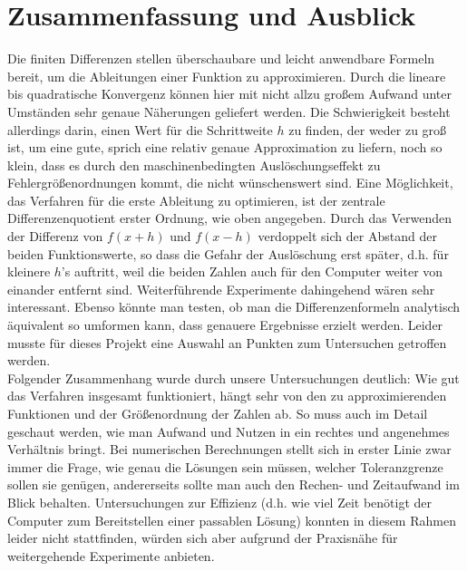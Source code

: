 \documentclass{scrartcl}
\begin{document}
\pagebreak \section{Zusammenfassung und Ausblick}
\label{sec:zusammenfassung}
Die finiten Differenzen stellen überschaubare und leicht anwendbare Formeln bereit, um die Ableitungen einer Funktion zu approximieren.
Durch die lineare bis quadratische Konvergenz können hier mit nicht allzu großem Aufwand unter Umständen sehr genaue Näherungen geliefert werden.
Die Schwierigkeit besteht allerdings darin, einen Wert für die Schrittweite $h$ zu finden, der weder zu groß ist, um eine gute, sprich eine relativ genaue Approximation zu liefern, noch so klein, dass es durch den maschinenbedingten Auslöschungseffekt zu Fehlergrößenordnungen kommt, die nicht wünschenswert sind.
Eine Möglichkeit, das Verfahren für die erste Ableitung zu optimieren, ist der zentrale Differenzenquotient erster Ordnung, wie oben angegeben. Durch das Verwenden der Differenz von $f(x+h)$ und $f(x-h)$ verdoppelt sich der Abstand der beiden Funktionswerte, so dass die Gefahr der Auslöschung erst später, d.h. für kleinere $h$'s auftritt, weil die beiden Zahlen auch für den Computer weiter von einander entfernt sind.
Weiterführende Experimente dahingehend wären sehr interessant.
Ebenso könnte man testen, ob man die Differenzenformeln analytisch äquivalent so umformen kann, dass genauere Ergebnisse erzielt werden. Leider musste für dieses Projekt eine Auswahl an Punkten zum Untersuchen getroffen werden. \\
Folgender Zusammenhang wurde durch unsere Untersuchungen deutlich:
Wie gut das Verfahren insgesamt funktioniert, hängt sehr von den zu approximierenden Funktionen und der Größenordnung der Zahlen ab.
So muss auch im Detail geschaut werden, wie man Aufwand und Nutzen in ein rechtes und angenehmes Verhältnis bringt.
Bei numerischen Berechnungen stellt sich in erster Linie zwar immer die Frage, wie genau die Lösungen sein müssen, welcher Toleranzgrenze sollen sie genügen, andererseits sollte man auch den Rechen- und Zeitaufwand im Blick behalten.
Untersuchungen zur Effizienz (d.h. wie viel Zeit benötigt der Computer zum Bereitstellen einer passablen Lösung) konnten in diesem Rahmen leider nicht stattfinden, würden sich aber aufgrund der Praxisnähe für weitergehende Experimente anbieten.



\end{document}
